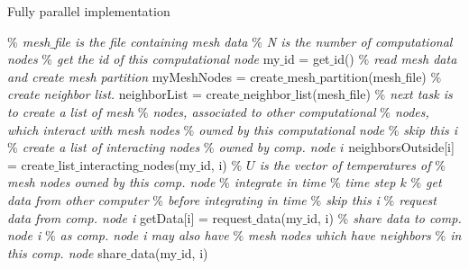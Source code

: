 \documentclass[11pt,twocolumn]{amsart}
\theoremstyle{definition}
\theoremstyle{definition}
\numberwithin{equation}{section}
\numberwithin{equation}{section}
\begin{document}
\begin{algorithm}[ht]
	\caption{Fully parallel implementation}
	\label{alg:parallel}
	\begin{algorithmic}[1]
		\STATE \textcolor{mygray}{\it $\%$ mesh$\_$file is the file containing mesh data}
		\STATE \textcolor{mygray}{\it $\%$ N is the number of computational nodes}
		\STATE
		\STATE \textcolor{mygray}{\it $\%$ get the id of this computational node }
		\STATE my$\_$id = get$\_$id()
		\STATE
		\STATE \textcolor{mygray}{\it $\%$ read mesh data and create mesh partition}
		\STATE myMeshNodes = create$\_$mesh$\_$partition(mesh$\_$file)
		\STATE
		\STATE \textcolor{mygray}{\it $\%$ create neighbor list.}
		\STATE neighborList = create$\_$neighbor$\_$list(mesh$\_$file)
		\STATE
		\STATE \textcolor{mygray}{\it $\%$ next task is to create a list of mesh}
		\STATE \textcolor{mygray}{\it $\%$ nodes, associated to other computational} 
		\STATE \textcolor{mygray}{\it $\%$ nodes, which interact with mesh nodes}
		\STATE \textcolor{mygray}{\it $\%$ owned by this computational node}
				\STATE \textcolor{mygray}{\it $\%$ skip this i}
			\ELSE
				\STATE \textcolor{mygray}{\it $\%$ create a list of interacting nodes}
				\STATE \textcolor{mygray}{\it $\%$ owned by comp. node $i$}
				\STATE neighborsOutside[i] 
				\STATE \; = create$\_$list$\_$interacting$\_$nodes(my$\_$id, i)			
			\ENDIF
		\ENDFOR
		\STATE
		\STATE \textcolor{mygray}{\it $\%$ $U$ is the vector of temperatures of}
		\STATE \textcolor{mygray}{\it $\%$ mesh nodes owned by this comp. node}
		\STATE 
		\STATE \textcolor{mygray}{\it $\%$ integrate in time}
			\STATE \textcolor{mygray}{\it $\%$ time step $k$}
			\STATE 
			\STATE \textcolor{mygray}{\it $\%$ get data from other computer }
			\STATE \textcolor{mygray}{\it $\%$ before integrating in time}
					\STATE \textcolor{mygray}{\it $\%$ skip this i}
				\ELSE
					\STATE \textcolor{mygray}{\it $\%$ request data from comp. node i}
					\STATE getData[i] = request$\_$data(my$\_$id, i)
					\STATE 
					\STATE \textcolor{mygray}{\it $\%$ share data to comp. node i}
					\STATE \textcolor{mygray}{\it $\%$ as comp. node i may also have}
					\STATE \textcolor{mygray}{\it $\%$ mesh nodes which have neighbors }
					\STATE \textcolor{mygray}{\it $\%$ in this comp. node}
					\STATE share$\_$data(my$\_$id, i)
				\ENDIF
			\ENDFOR
	\end{algorithmic}
\end{algorithm}			
\end{document}
